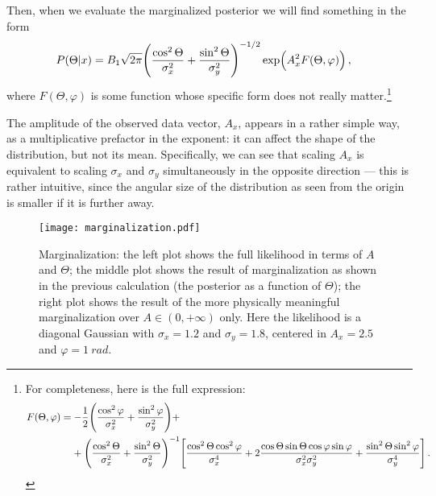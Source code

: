 \documentclass[main.tex]{subfiles}
\begin{document}
Then, when we  evaluate the marginalized posterior we will find something in the form
%
\begin{align}
P(\Theta | x) &= B_1 \sqrt{2 \pi } \qty( \frac{\cos^2\Theta }{\sigma_x^2} + \frac{\sin^2 \Theta }{\sigma _y^2})^{-1/2}
\exp( A_x^2 F(\Theta , \varphi ))
\,,
\end{align}
%
where \(F (\Theta , \varphi )\) is some function whose specific form does not really matter.\footnote{For completeness, here is the full expression: 
%
\begin{align}
\begin{split}
F(\Theta , \varphi ) &=
- \frac{1}{2} \qty( \frac{\cos^2\varphi}{\sigma^2_x} + \frac{\sin^2\varphi}{\sigma^2_y})+  \\
&\phantom{=}\ 
+ 
\qty( \frac{\cos^2 \Theta}{\sigma _x^2} + \frac{\sin^2 \Theta }{\sigma _y^2})^{-1}
\qty[ 
    \frac{\cos^2 \Theta \cos^2 \varphi }{\sigma _x^{4}}
    +2\frac{\cos \Theta \sin \Theta \cos \varphi \sin \varphi  }{\sigma _x^{2} \sigma _y^{2}}
    +\frac{\sin^2 \Theta \sin^2 \varphi }{\sigma _y^{4}}
]
\,.
\end{split}
\end{align}
%
}

The amplitude of the observed data vector, \(A_x\), appears in a rather simple way, as a multiplicative prefactor in the exponent: it can affect the shape of the distribution, but not its mean.
Specifically, we can see that scaling \(A_x\) is equivalent to scaling \(\sigma _x\) and \(\sigma _y\) simultaneously in the opposite direction --- this is rather intuitive, since the angular size of the distribution as seen from the origin is smaller if it is further away. 


\begin{figure}[ht]
\centering
\texttt{[image: marginalization.pdf]}
\caption{Marginalization: the left plot shows the full likelihood in terms of \(A\) and \(\Theta \); the middle plot shows the result of marginalization as shown in the previous calculation (the posterior as a function of \(\Theta \)); the right plot shows the result of the more physically meaningful marginalization over \(A \in (0, + \infty )\) only.
Here the likelihood is a diagonal Gaussian with \(\sigma _x = \num{1.2}\) and \(\sigma _y = \num{1.8}\), centered in \(A_x = \num{2.5}\) and \(\varphi = \SI{1}{rad}\).}
\label{fig:marginalization}
\end{figure}
\end{document}
